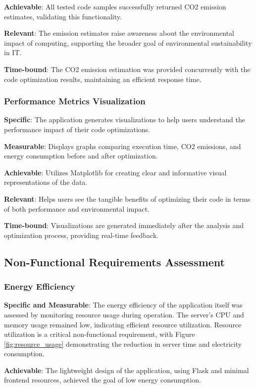 \documentclass[conference,compsoc]{IEEEtran}
\begin{document}
\textbf{Achievable}: All tested code samples successfully returned CO2 emission estimates, validating this functionality.

\textbf{Relevant}: The emission estimates raise awareness about the environmental impact of computing, supporting the broader goal of environmental sustainability in IT.

\textbf{Time-bound}: The CO2 emission estimation was provided concurrently with the code optimization results, maintaining an efficient response time.

\subsubsection{Performance Metrics Visualization}
\textbf{Specific}: The application generates visualizations to help users understand the performance impact of their code optimizations.

\textbf{Measurable}: Displays graphs comparing execution time, CO2 emissions, and energy consumption before and after optimization.

\textbf{Achievable}: Utilizes Matplotlib for creating clear and informative visual representations of the data.

\textbf{Relevant}: Helps users see the tangible benefits of optimizing their code in terms of both performance and environmental impact.

\textbf{Time-bound}: Visualizations are generated immediately after the analysis and optimization process, providing real-time feedback.

\subsection{Non-Functional Requirements Assessment}
\subsubsection{Energy Efficiency}
\textbf{Specific and Measurable}: The energy efficiency of the application itself was assessed by monitoring resource usage during operation. The server's CPU and memory usage remained low, indicating efficient resource utilization. Resource utilization is a critical non-functional requirement, with Figure \ref{fig:resource_usage} demonstrating the reduction in server time and electricity consumption.

\textbf{Achievable}: The lightweight design of the application, using Flask and minimal frontend resources, achieved the goal of low energy consumption.
\end{document}
